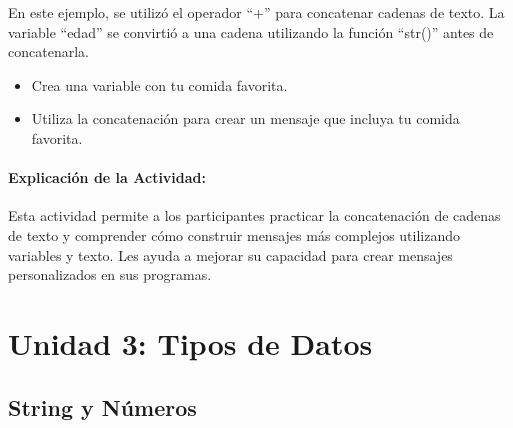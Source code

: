 \documentclass[
  a4paper,
  DIV=11,
  numbers=noendperiod,
  onepage,
  openany]{scrreprt}
\providecommand{\tightlist}{%
  \setlength{\itemsep}{0pt}\setlength{\parskip}{0pt}}\usepackage{longtable,booktabs,array}
\begin{document}
En este ejemplo, se utilizó el operador ``+'' para concatenar cadenas de
texto. La variable ``edad'' se convirtió a una cadena utilizando la
función ``str()'' antes de concatenarla.

\begin{tcolorbox}[enhanced jigsaw, leftrule=.75mm, bottomtitle=1mm, title=\textcolor{quarto-callout-tip-color}{\faLightbulb}\hspace{0.5em}{Actividad Práctica}, colbacktitle=quarto-callout-tip-color!10!white, coltitle=black, bottomrule=.15mm, colframe=quarto-callout-tip-color-frame, titlerule=0mm, opacityback=0, rightrule=.15mm, toptitle=1mm, opacitybacktitle=0.6, arc=.35mm, breakable, colback=white, toprule=.15mm, left=2mm]

\begin{itemize}
\tightlist
\item
  Crea una variable con tu comida favorita.
\item
  Utiliza la concatenación para crear un mensaje que incluya tu comida
  favorita.
\end{itemize}

\end{tcolorbox}

\subsection{Explicación de la
Actividad:}\label{explicaciuxf3n-de-la-actividad-3}

Esta actividad permite a los participantes practicar la concatenación de
cadenas de texto y comprender cómo construir mensajes más complejos
utilizando variables y texto. Les ayuda a mejorar su capacidad para
crear mensajes personalizados en sus programas.

\part{Unidad 3: Tipos de Datos}

\chapter{String y Números}\label{string-y-nuxfameros}
\end{document}
